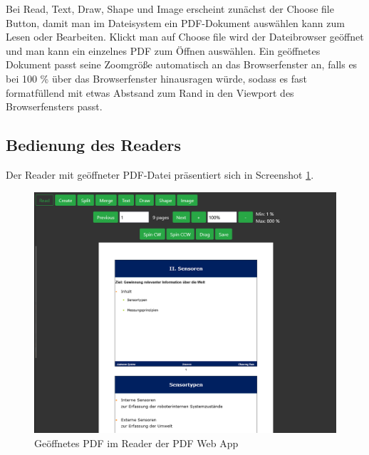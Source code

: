 Bei Read, Text, Draw, Shape und Image erscheint zunächst der Choose file Button, damit man im Dateisystem ein PDF-Dokument auswählen kann zum Lesen oder Bearbeiten. Klickt man auf Choose file wird der Dateibrowser geöffnet und man kann ein einzelnes PDF zum Öffnen auswählen. Ein geöffnetes Dokument passt seine Zoomgröße automatisch an das Browserfenster an, falls es bei 100 \% über das Browserfenster hinausragen würde, sodass es fast formatfüllend mit etwas Abstsand zum Rand in den Viewport des Browserfensters passt. 

\subsection{Bedienung des Readers}
Der Reader mit geöffneter PDF-Datei präsentiert sich in Screenshot \ref{fig:reader}.

\begin{figure}[!htbp]
	\centering
	\includegraphics[width=1\textwidth]{"images/reader.png"}
	\caption{Geöffnetes PDF im Reader der PDF Web App}
	\label{fig:reader}
\end{figure}

